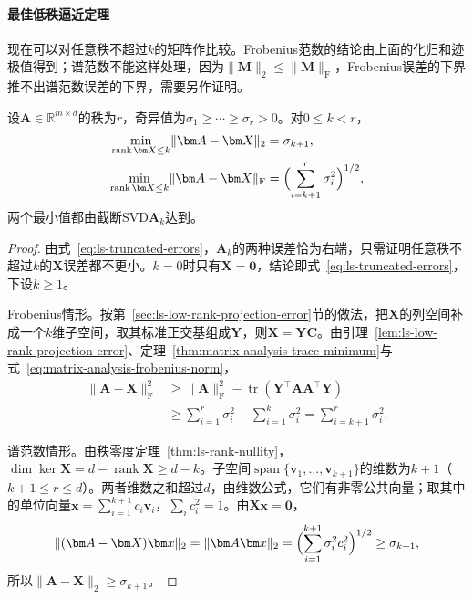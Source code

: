 \paragraph{最佳低秩逼近定理}

现在可以对任意秩不超过$k$的矩阵作比较。Frobenius范数的结论由上面的化归和迹极值得到；谱范数不能这样处理，因为$\lVert\bm M\rVert_2\leq\lVert\bm M\rVert_{\mathrm F}$，Frobenius误差的下界推不出谱范数误差的下界，需要另作证明。

\begin{theorem}
\label{thm:ls-best-low-rank}
\label{thm:matrix-analysis-best-low-rank}
设$\bm A\in\mathbb R^{m\times d}$的秩为$r$，奇异值为$\sigma_1\geq\cdots\geq\sigma_r>0$。对$0\leq k<r$，
\begin{align}
 \min_{\operatorname{rank}\bm X\leq k}\lVert\bm A-\bm X\rVert_2
 &=\sigma_{k+1},
 \label{eq:matrix-analysis-best-rank-k-spectral}\\
 \min_{\operatorname{rank}\bm X\leq k}\lVert\bm A-\bm X\rVert_{\mathrm F}
 &=\Bigl(\sum_{i=k+1}^r\sigma_i^2\Bigr)^{1/2},
 \label{eq:matrix-analysis-best-rank-k-frobenius}
\end{align}
两个最小值都由截断SVD$\bm A_k$达到。
\end{theorem}
\begin{proof}
由式~\eqref{eq:ls-truncated-errors}，$\bm A_k$的两种误差恰为右端，只需证明任意秩不超过$k$的$\bm X$误差都不更小。$k=0$时只有$\bm X=\bm0$，结论即式~\eqref{eq:ls-truncated-errors}，下设$k\geq1$。

Frobenius情形。按第~\ref{sec:ls-low-rank-projection-error}节的做法，把$\bm X$的列空间补成一个$k$维子空间，取其标准正交基组成$\bm Y$，则$\bm X=\bm Y\bm C$。由引理~\ref{lem:ls-low-rank-projection-error}、定理~\ref{thm:matrix-analysis-trace-minimum}与式~\eqref{eq:matrix-analysis-frobenius-norm}，
\[
 \begin{aligned}
 \lVert\bm A-\bm X\rVert_{\mathrm F}^2
 &\geq\lVert\bm A\rVert_{\mathrm F}^2-\operatorname{tr}(\bm Y^\top\bm A\bm A^\top\bm Y)\\
 &\geq\sum_{i=1}^r\sigma_i^2-\sum_{i=1}^k\sigma_i^2=\sum_{i=k+1}^r\sigma_i^2 .
 \end{aligned}
\]

谱范数情形。由秩零度定理~\ref{thm:ls-rank-nullity}，$\dim\ker\bm X=d-\operatorname{rank}\bm X\geq d-k$。子空间$\operatorname{span}\{\bm v_1,\ldots,\bm v_{k+1}\}$的维数为$k+1$（$k+1\leq r\leq d$）。两者维数之和超过$d$，由维数公式，它们有非零公共向量；取其中的单位向量$\bm x=\sum_{i=1}^{k+1}c_i\bm v_i$，$\sum_ic_i^2=1$。由$\bm X\bm x=\bm0$，
\begin{equation}
 \lVert(\bm A-\bm X)\bm x\rVert_2
 =\lVert\bm A\bm x\rVert_2
 =\Bigl(\sum_{i=1}^{k+1}\sigma_i^2c_i^2\Bigr)^{1/2}
 \geq\sigma_{k+1},
 \label{eq:ls-spectral-lower-bound}
\end{equation}
所以$\lVert\bm A-\bm X\rVert_2\geq\sigma_{k+1}$。
\end{proof}

